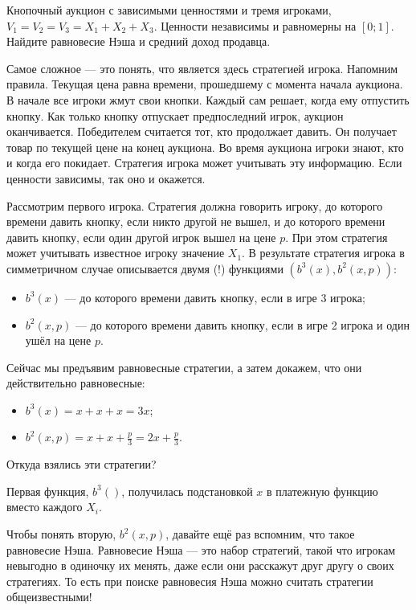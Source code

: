 \begin{myex} Кнопочный аукцион с зависимыми ценностями и тремя игроками, $ V_{1}=V_{2}=V_{3}=X_{1}+X_{2}+X_{3} $. Ценности независимы и равномерны на $ [0;1] $. Найдите равновесие Нэша и средний доход продавца.

Самое сложное — это понять, что является здесь стратегией игрока. Напомним правила. Текущая цена равна времени, прошедшему с момента начала аукциона. В начале все игроки жмут свои кнопки. Каждый сам решает, когда ему отпустить кнопку. Как только кнопку отпускает предпоследний игрок, аукцион оканчивается. Победителем считается тот, кто продолжает давить. Он получает товар по текущей цене на конец аукциона. Во время аукциона игроки знают, кто и когда его покидает. Стратегия игрока может учитывать эту информацию. Если ценности зависимы, так оно и окажется.

Рассмотрим первого игрока. Стратегия должна говорить игроку, до которого времени давить кнопку, если никто другой не вышел, и до которого времени давить кнопку, если один другой игрок вышел на цене $ p $. При этом стратегия может учитывать известное игроку значение $ X_{1} $. В результате стратегия игрока в симметричном случае описывается двумя (!) функциями $ (b^{3}(x), b^{2}(x,p)) $:
\begin{itemize}
\item $ b^{3}(x) $ — до которого времени давить кнопку, если в игре 3 игрока;
\item $ b^{2}(x,p) $ — до которого времени давить кнопку, если в игре 2 игрока и один ушёл на цене $ p $.
\end{itemize}


Сейчас мы предъявим равновесные стратегии, а затем докажем, что они действительно равновесные:

\begin{itemize}
\item $ b^{3}(x)=x+x+x=3x$;
\item $ b^{2}(x,p)=x+x+\frac{p}{3}=2x+\frac{p}{3}$.
\end{itemize}

Откуда взялись эти стратегии?


Первая функция, $ b^{3}() $, получилась подстановкой $ x $ в платежную функцию вмес\-то каждого $ X_{i} $.

Чтобы понять вторую, $ b^{2}(x,p) $, давайте ещё раз вспомним, что такое равновесие Нэша.  Равновесие Нэша — это набор стратегий, такой что игрокам невыгодно в одиночку их менять, даже если они расскажут друг другу о своих стратегиях. То есть при поиске равновесия Нэша можно считать стратегии общеизвестными!


\end{myex}
